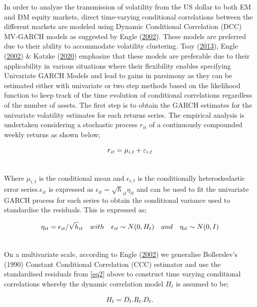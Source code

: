 \documentclass[11pt,preprint, authoryear]{elsarticle}
\numberwithin{equation}{section}
\numberwithin{figure}{section}
\numberwithin{table}{section}
\begin{document}
In order to analyze the transmission of volatility from the US dollar to
both EM and DM equity markets, direct time-varying conditional
correlations between the different markets are modeled using Dynamic
Conditional Correlation (DCC) MV-GARCH models as suggested by Engle
(\protect\hyperlink{ref-engle2002}{2002}). These models are preferred
due to their ability to accommodate volatility clustering. Tsay
(\protect\hyperlink{ref-tsay2013}{2013}), Engle
(\protect\hyperlink{ref-engle2002}{2002}) \& Katzke
(\protect\hyperlink{ref-katzke2020}{2020}) emphasize that these models
are preferable due to their applicability in various situations where
their flexibility enables specifying Univariate GARCH Models and lead to
gains in parsimony as they can be estimated either with univariate or
two step methods based on the likelihood function to keep track of the
time evolution of conditional correlations regardless of the number of
assets. The first step is to obtain the GARCH estimates for the
univariate volatility estimates for each returns series. The empirical
analysis is undertaken considering a stochastic process \(r_{it}\) of a
continuously compounded weekly returns as shown below;

\begin{align}
r_{it} = \mu_{i,t} + \varepsilon_{i,t}  \label{eq1} \\ \notag 
\end{align}

Where \(\mu_{i,t}\) is the conditional mean and \(\epsilon_{i,t}\) is
the conditionally heteroskedastic error series.\(\epsilon_{it}\) is
expressed as \(\epsilon_{it}= \sqrt h_{it} \eta_{it}\) and can be used
to fit the univariate GARCH process for each series to obtain the
conditional variance used to standardise the residuals. This is
expressed as;

\begin{align}
\eta_{it}= \epsilon_{it}/ \sqrt h_{it} \quad with \quad \epsilon_{it} \sim N(0,H_t)\quad and\quad \eta_{it} \sim N(0,I)   \label{eq2} \\ \notag 
\end{align}

On a multivariate scale, according to Engle
(\protect\hyperlink{ref-engle2002}{2002}) we generalise Bollerslev's
(1990) Constant Conditional Correlation (CCC) estimator and use the
standardised residuals from \ref{eq2} above to construct time varying
conditional correlations whereby the dynamic correlation model \(H_t\)
is assumed to be;

\begin{align} 
H_t = D_t.R_t.D_t. \label{eq3} \\ \notag
\end{align}
\end{document}
